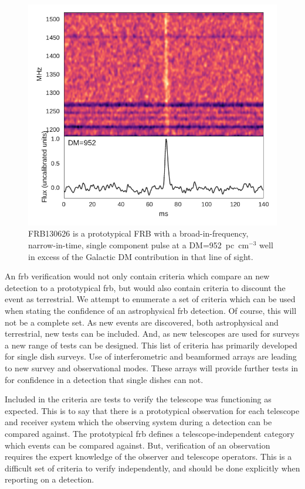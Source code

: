 \documentclass[a4paper,fleqn,usenatbib]{mnras}
\begin{document}
\begin{figure}
    \includegraphics[width=1.0\linewidth]{figures/FRB130626.pdf}
    \caption{FRB130626 is a prototypical FRB with a broad-in-frequency,
    narrow-in-time, single component pulse at a DM=952~pc~cm$^{-3}$ well in
    excess of the Galactic DM contribution in that line of sight.
    }
    \label{fig:FRB130626}
\end{figure}

An \gls{frb} verification would not only contain criteria which compare an new
detection to a prototypical \gls{frb}, but would also contain criteria to
discount the event as terrestrial. We attempt to enumerate a set of criteria
which can be used when stating the confidence of an astrophysical \gls{frb}
detection. Of course, this will not be a complete set. As new events are
discovered, both astrophysical and terrestrial, new tests can be included. And,
as new telescopes are used for surveys a new range of tests can be designed.
This list of criteria has primarily developed for single dish surveys.  Use of
interferometric and beamformed arrays are leading to new survey and
observational modes. These arrays will provide further tests in for confidence
in a detection that single dishes can not.

Included in the criteria are tests to verify the telescope was functioning as
expected. This is to say that there is a prototypical observation for each
telescope and receiver system which the observing system during a detection can
be compared against. The prototypical \gls{frb} defines a telescope-independent
category which events can be compared against. But, verification of an
observation requires the expert knowledge of the observer and telescope
operators. This is a difficult set of criteria to verify independently, and
should be done explicitly when reporting on a detection.
\end{document}
